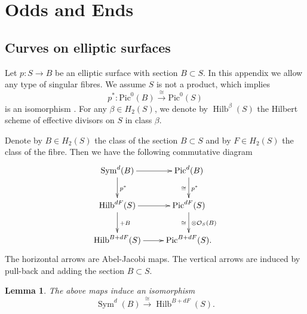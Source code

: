 \documentclass{amsart}
\newtheorem{lemma}[theorem]{Lemma}
\theoremstyle{definition}
\newtheorem{remark}[theorem]{Remark}
\renewcommand{\O}{\mathcal{O}}
\newcommand{\Pic}{\mathrm{Pic}}
\newcommand{\Sym}{\operatorname{Sym}}
\newcommand{\Hilb}{\operatorname{Hilb}}
\begin{document}
\appendix
\section{Odds and Ends}\label{appendix: odds and ends}

\subsection{Curves on elliptic surfaces}\label{appHilb}

Let $p : S \rightarrow B$ be an elliptic surface with section $B \subset S$. In this appendix we allow any type of singular fibres. We assume $S$ is not a product, which implies
$$
p^* : \Pic^0(B) \stackrel{\cong}{\longrightarrow} \Pic^0(S)
$$
is an isomorphism \cite[VII.1.1]{Mir}. For any $\beta \in H_2(S)$, we denote by $\Hilb^\beta(S)$ the Hilbert scheme of effective divisors on $S$ in class $\beta$. 

Denote by $B \in H_2(S)$ the class of the section $B \subset S$ and by $F \in H_2(S)$ the class of the fibre. Then we have the following commutative diagram 
\begin{displaymath}
\xymatrix
{
\Sym^d(B) \ar[d]^{p^*} \ar[r] & \Pic^d(B) \ar[d]^{p^*}_{\cong} \\
\Hilb^{dF}(S) \ar[d]^{+B} \ar[r] & \Pic^{dF}(S) \ar[d]^{\otimes \O_S(B)}_{\cong} \\
\Hilb^{B+dF}(S) \ar[r] & \Pic^{B+dF}(S). 
}
\end{displaymath}
The horizontal arrows are Abel-Jacobi maps. The vertical arrows are induced by pull-back and adding the section $B \subset S$. 
\begin{lemma} \label{Hilbcvs}
The above maps induce an isomorphism
$$
\Sym^d(B) \stackrel{\cong}{\longrightarrow} \Hilb^{B+dF}(S).
$$
\end{lemma}

\end{document}
